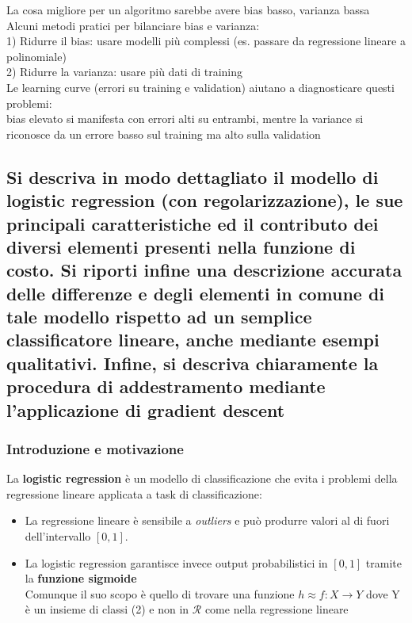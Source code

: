 \documentclass[10pt,oneside,a4paper]{article}
\begin{document}
	La cosa migliore per un algoritmo sarebbe avere bias basso, varianza bassa\\
	Alcuni metodi pratici per bilanciare bias e varianza:\\
	1) Ridurre il bias: usare modelli più complessi (es. passare da regressione lineare a polinomiale)\\
	2) Ridurre la varianza: usare più dati di training\\
	Le learning curve (errori su training e validation) aiutano a diagnosticare questi problemi:\\
	bias elevato si manifesta con errori alti su entrambi, mentre la variance si riconosce da un errore basso sul training ma alto sulla validation\\

	
	
	\subsection{Si descriva in modo dettagliato il
		modello di logistic regression (con regolarizzazione), le sue principali caratteristiche ed il contributo dei diversi elementi presenti nella funzione
		di costo. Si riporti infine una descrizione accurata delle differenze e degli elementi in comune di tale modello rispetto
		ad un semplice classificatore lineare, anche mediante esempi qualitativi. Infine, si descriva chiaramente la procedura di addestramento
		mediante l’applicazione di gradient descent}
		
	\subsubsection{Introduzione e motivazione}
	La \textbf{logistic regression} è un modello di classificazione che evita i problemi della regressione lineare applicata a task di classificazione:
	\begin{itemize}
		\item La regressione lineare è sensibile a \textit{outliers} e può produrre valori al di fuori dell'intervallo $[0,1]$.
		\item La logistic regression garantisce invece output probabilistici in $[0,1]$ tramite la \textbf{funzione sigmoide}\\
		Comunque il suo scopo è quello di trovare una funzione $h \approx f: X \to Y$ dove Y è un insieme di classi (2) e non in $\mathcal{R}$ come nella regressione lineare
	\end{itemize}
	
\end{document}
